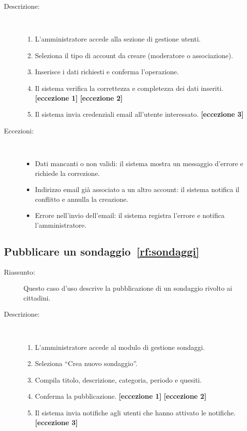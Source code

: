 \begin{ucscope}
\begin{description}
	\item[Descrizione:]~
	\begin{enumerate}
		\item L’amministratore accede alla sezione di gestione utenti.
		\item Seleziona il tipo di account da creare (moderatore o associazione).
		\item Inserisce i dati richiesti e conferma l’operazione.
		\item Il sistema verifica la correttezza e completezza dei dati inseriti. \textbf{[eccezione 1]} \textbf{[eccezione 2]}
		\item Il sistema invia credenziali email all’utente interessato. \textbf{[eccezione 3]}
	\end{enumerate}

	\item[Eccezioni:]~
	\begin{itemize}
		\item[(1)] Dati mancanti o non validi: il sistema mostra un messaggio d’errore e richiede la correzione.
		\item[(2)] Indirizzo email già associato a un altro account: il sistema notifica il conflitto e annulla la creazione.
		\item[(3)] Errore nell’invio dell’email: il sistema registra l’errore e notifica l’amministratore.
	\end{itemize}
\end{description}

\subsection{Pubblicare un sondaggio~\ref{rf:sondaggi}}
\begin{description}
	\item[Riassunto:]
	Questo caso d’uso descrive la pubblicazione di un sondaggio rivolto ai cittadini.

	\item[Descrizione:]~
	\begin{enumerate}
		\item L’amministratore accede al modulo di gestione sondaggi.
		\item Seleziona ``Crea nuovo sondaggio''.
		\item Compila titolo, descrizione, categoria, periodo e quesiti.
		\item Conferma la pubblicazione. \textbf{[eccezione 1]} \textbf{[eccezione 2]}
		\item Il sistema invia notifiche agli utenti che hanno attivato le notifiche. \textbf{[eccezione 3]}
	\end{enumerate}


\end{description}
\end{ucscope}
